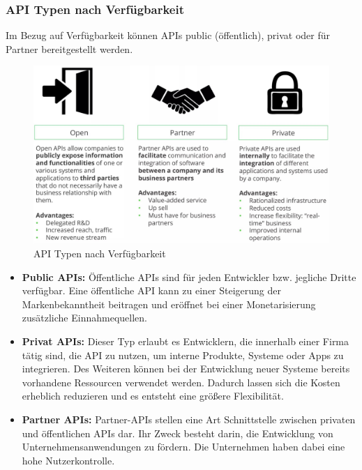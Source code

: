 \subsubsection{API Typen nach Verfügbarkeit} %
\label{sec:apitypenverfuegbarkeit}
Im Bezug auf Verfügbarkeit können APIs public (öffentlich), privat oder für Partner bereitgestellt werden. 
\begin{figure}[h!]
	\centering
	\includegraphics[scale=0.225]{Illustrations/apitypes.jpg}
	\caption{API Typen nach Verfügbarkeit \citep{graficapitypes}}
\end{figure}

\begin{itemize}
	\item \textbf{Public APIs:} Öffentliche APIs sind für jeden Entwickler bzw. jegliche Dritte verfügbar. Eine öffentliche API kann zu einer Steigerung der Markenbekanntheit beitragen und eröffnet bei einer Monetarisierung zusätzliche Einnahmequellen.\citep{apistrategyguide}
	\item \textbf{Privat APIs:} Dieser Typ erlaubt es Entwicklern, die innerhalb einer Firma tätig sind, die API zu nutzen, um interne Produkte, Systeme oder Apps zu integrieren. Des Weiteren können bei der Entwicklung neuer Systeme bereits vorhandene Ressourcen verwendet werden. Dadurch lassen sich die Kosten erheblich reduzieren und es entsteht eine größere Flexibilität. \citep{apistrategyguide}
	\item \textbf{Partner APIs:} Partner-APIs stellen eine Art Schnittstelle zwischen privaten und öffentlichen APIs dar. Ihr Zweck besteht darin, die Entwicklung von Unternehmensanwendungen zu fördern. Die Unternehmen haben dabei eine hohe Nutzerkontrolle.\citep{apistrategyguide}
\end{itemize}

